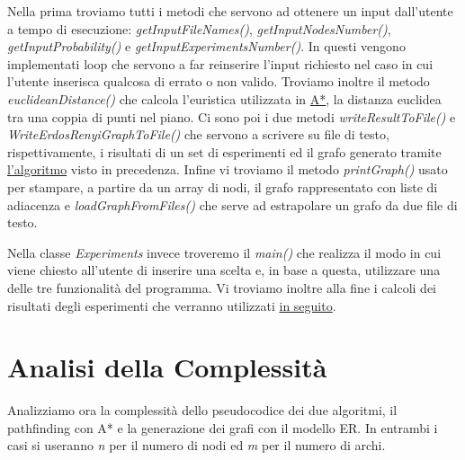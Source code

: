 \documentclass[12pt,a4paper]{report}
\begin{document}
Nella prima troviamo tutti i metodi che servono ad ottenere un input dall'utente a tempo di esecuzione: \textit{getInputFileNames()}, \textit{getInputNodesNumber()}, \textit{getInputProbability()} e \textit{getInputExperimentsNumber()}. In questi vengono implementati loop che servono a far reinserire l'input richiesto nel caso in cui l'utente inserisca qualcosa di errato o non valido.
Troviamo inoltre il metodo \textit{euclideanDistance()} che calcola l'euristica utilizzata in \hyperref[se:a-star-coda-mappa]{A*}, la distanza euclidea tra una coppia di punti nel piano.
Ci sono poi i due metodi \textit{writeResultToFile()} e \textit{WriteErdosRenyiGraphToFile()} che servono a scrivere su file di testo, rispettivamente, i risultati di un set di esperimenti ed il grafo generato tramite \hyperref[se:gen-modello-ER]{l'algoritmo} visto in precedenza.
Infine vi troviamo il metodo \textit{printGraph()} usato per stampare, a partire da un array di nodi, il grafo rappresentato con liste di adiacenza e \textit{loadGraphFromFiles()} che serve ad estrapolare un grafo da due file di testo.

\medskip

Nella classe \textit{Experiments} invece troveremo il \textit{main()} che realizza il modo in cui viene chiesto all'utente di inserire una scelta e, in base a questa, utilizzare una delle tre funzionalità del programma. Vi troviamo inoltre alla fine i calcoli dei risultati degli esperimenti che verranno utilizzati \hyperref[ch:dati-sperim]{in seguito}.


\chapter{Analisi della Complessità}\label{ch:anal-comp}

Analizziamo ora la complessità dello pseudocodice dei due algoritmi, il pathfinding con A* e la generazione dei grafi con il modello ER.
In entrambi i casi si useranno \textit{n} per il numero di nodi ed \textit{m} per il numero di archi.
\end{document}
